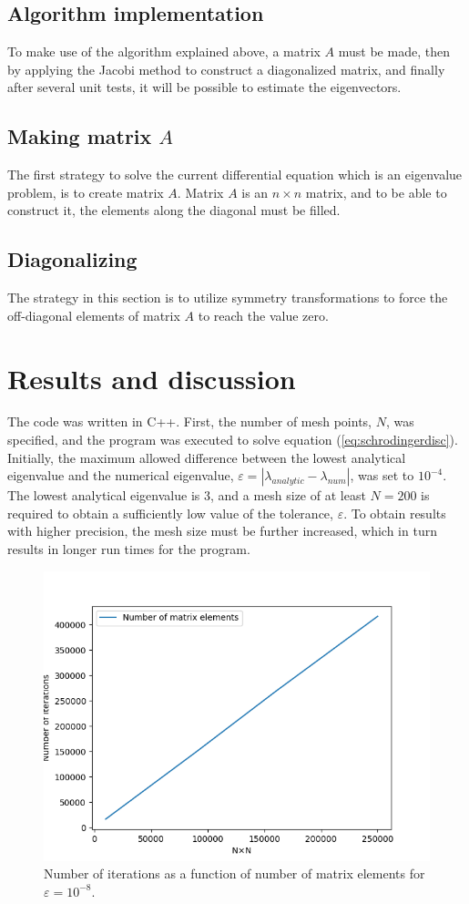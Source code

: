 \documentclass[12pt, a4paper, reqno, article]{amsart}
\begin{document}
\subsection{Algorithm implementation}
To make use of the algorithm explained above, a matrix $A$ must be made, then by applying the Jacobi method to construct a diagonalized matrix, and finally after several unit tests, it will be possible to estimate the eigenvectors.

\subsection{Making matrix $A$}
The first strategy to solve the current differential equation which is an eigenvalue problem, is to create matrix $A$. Matrix $A$ is an $n\times n$ matrix, and to be able to construct it, the elements along the diagonal must be filled.

\subsection{Diagonalizing}
The strategy in this section is to utilize symmetry transformations to force the off-diagonal elements of matrix $A$ to reach the value zero.

\section{Results and discussion}
The code was written in C++. First, the number of mesh points, $N$, was specified, and the program was executed to solve equation (\ref{eq:schrodingerdisc}). Initially, the maximum allowed difference between the lowest analytical eigenvalue and the numerical eigenvalue, $\varepsilon = \left| \lambda_{analytic}- \lambda_{num} \right|$, was set to $10^{-4}$. The lowest analytical eigenvalue is 3, and a mesh size of at least $N=200$ is required to obtain a sufficiently low value of the tolerance, $\varepsilon$. To obtain results with higher precision, the mesh size must be further increased, which in turn results in longer run times for the program.

\begin{figure}[h]
  \centering
  \includegraphics[width=0.8\linewidth]{iterations-vs-elements.png}
  \caption{Number of iterations as a function of number of matrix elements for $\varepsilon = 10^{-8}$.}
  \label{fig:iterations-vs-elements}
\end{figure}
\end{document}
